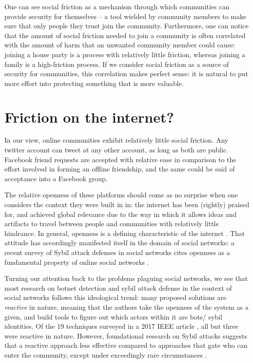 \documentclass[sigconf,authordraft]{acmart}
\begin{document}
One can see social friction as a mechanism through which communities can provide security for themselves -- a tool wielded by community members to make sure that only people they trust join the community. Furthermore, one can notice that the amount of social friction needed to join a community is often correlated with the amount of harm that an unwanted community member could cause: joining a house party is a process with relatively little friction, whereas joining a family is a high-friction process. If we consider social friction as a source of security for communities, this correlation makes perfect sense: it is natural to put more effort into protecting something that is more valuable.

\section{Friction on the internet?}

In our view, online communities exhibit relatively little social friction. Any twitter account can tweet at any other account, as long as both are public. Facebook friend requests are accepted with relative ease in comparison to the effort involved in forming an offline friendship, and the same could be said of acceptance into a Facebook group.

The relative openness of these platforms should come as no surprise when one considers the context they were built in in: the internet has been (rightly) praised for, and achieved global relevance due to the way in which it allows ideas and artifacts to travel between people and communities with relatively little hindrance. In general, openness is a defining characteristic of the internet \cite{bechmann2014ubiquitous, lessig2002future}. That attitude has accordingly manifested itself in the domain of social networks: a recent survey of Sybil attack defenses in social networks cites openness as a fundamental property of online social networks \cite{al2017sybil}.

Turning our attention back to the problems plaguing social networks, we see that most research on botnet detection and sybil attack defense in the context of social networks follows this ideological trend: many proposed solutions are {\itshape reactive} in nature, meaning that the authors take the openness of the system as a given, and build tools to figure out which actors within it are bots/ sybil identities. Of the 19 techniques surveyed in a 2017 IEEE article \cite{al2017sybil}, all but three \cite{yu2006sybilguard,yu2008sybillimit,Tran2011Gatekeeper} were reactive in nature. However, foundational research on Sybil attacks suggests that a reactive approach less effective compared to approaches that gate who can enter the community, except under exceedingly rare circumstances \cite{douceur2002sybil}.
\end{document}
